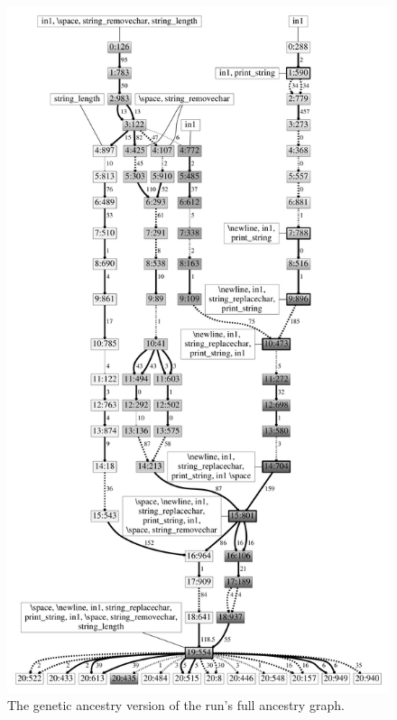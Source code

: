 \documentclass[graybox]{svmult}
\begin{document}
\begin{figure}[tb!p] %
	\begin{center}
		\includegraphics[height=0.95 \textheight]{../figures/filtered_fill}
	\end{center}
	\caption{The genetic ancestry version of the run's full ancestry graph.}
	\label{fig:run0Filtered}       %
\end{figure}
\end{document}
